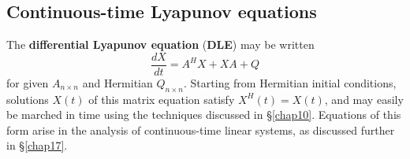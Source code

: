 \subsection{Continuous-time Lyapunov equations}\label{sec:CTLE}

The {\bf differential Lyapunov equation} ({\bf DLE}) may be written
\begin{equation}
\frac{dX}{dt} = A^H X + X A + Q
\label{eq:DLE}
\end{equation}
for given $A_{n\times n}$ and Hermitian $Q_{n\times n}$.
Starting from Hermitian initial conditions, solutions $X(t)$ of this matrix equation satisfy $X^H(t)=X(t)$,
and may easily be marched in time using the techniques discussed in \S \ref{chap10}.
Equations of this form arise in the analysis of continuous-time linear systems, as discussed further in \S \ref{chap17}.  

\begin{figure*}[t]
\end{figure*}

